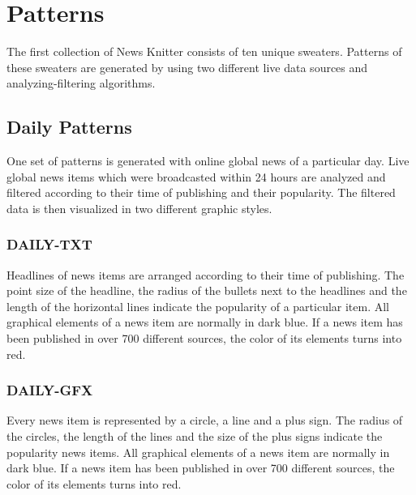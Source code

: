 \documentclass{acmsiggraph}                     %
\begin{document}





\section{Patterns}

The first collection of News Knitter consists of ten unique sweaters. Patterns of these sweaters are generated by using two different live data sources and analyzing-filtering algorithms.



\subsection{Daily Patterns}

One set of patterns is generated with online global news of a particular day. Live global news items which were broadcasted within 24 hours are analyzed and filtered according to their time of publishing and their popularity. The filtered data is then visualized in two different graphic styles.

\subsubsection{DAILY-TXT}
Headlines of news items are arranged according to their time of publishing. The point size of the headline, the radius of the bullets next to the headlines and the length of the horizontal lines indicate the popularity of a particular item. All graphical elements of a news item are normally in dark blue. If a news item has been published in over 700 different sources, the color of its elements turns into red.

\subsubsection{DAILY-GFX}
Every news item is represented by a circle, a line and a plus sign. The radius of the circles, the length of the lines and the size of the plus signs indicate the popularity news items. All graphical elements of a news item are normally in dark blue. If a news item has been published in over 700 different sources, the color of its elements turns into red.
\end{document}
